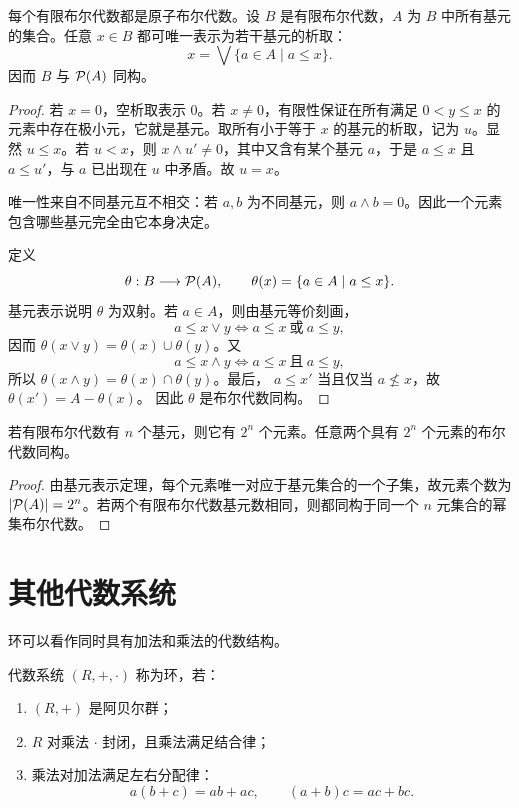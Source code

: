 \begin{theorem}[有限布尔代数的基元表示]\label{finite-boolean-atoms}
  每个有限布尔代数都是原子布尔代数。设 $B$ 是有限布尔代数，$A$ 为 $B$ 中所有基元的集合。任意 $x\in B$ 都可唯一表示为若干基元的析取：
  \[
  x=\bigvee\{a\in A\mid a\le x\}.
  \]
  因而 $B$ 与 $\mathcal P(A)$ 同构。
\end{theorem}

\begin{proof}
  若 $x=0$，空析取表示 $0$。若 $x\ne0$，有限性保证在所有满足 $0<y\le x$ 的元素中存在极小元，它就是基元。取所有小于等于 $x$ 的基元的析取，记为 $u$。显然 $u\le x$。若 $u<x$，则 $x\wedge u'\ne0$，其中又含有某个基元 $a$，于是 $a\le x$ 且 $a\le u'$，与 $a$ 已出现在 $u$ 中矛盾。故 $u=x$。

  唯一性来自不同基元互不相交：若 $a,b$ 为不同基元，则 $a\wedge b=0$。因此一个元素包含哪些基元完全由它本身决定。

  定义
  \[
  \theta:B\longrightarrow\mathcal P(A),\qquad
  \theta(x)=\{a\in A\mid a\le x\}.
  \]
  基元表示说明 $\theta$ 为双射。若 $a\in A$，则由基元等价刻画，
  \[
  a\le x\vee y\Longleftrightarrow a\le x\ \text{或}\ a\le y,
  \]
  因而 $\theta(x\vee y)=\theta(x)\cup\theta(y)$。又
  \[
  a\le x\wedge y\Longleftrightarrow a\le x\ \text{且}\ a\le y,
  \]
  所以 $\theta(x\wedge y)=\theta(x)\cap\theta(y)$。最后，
  $a\le x'$ 当且仅当 $a\nleq x$，故 $\theta(x')=A-\theta(x)$。
  因此 $\theta$ 是布尔代数同构。
\end{proof}

\begin{theorem}[有限布尔代数的大小]\label{finite-boolean-size}
  若有限布尔代数有 $n$ 个基元，则它有 $2^n$ 个元素。任意两个具有 $2^n$ 个元素的布尔代数同构。
\end{theorem}

\begin{proof}
  由基元表示定理，每个元素唯一对应于基元集合的一个子集，故元素个数为 $\lvert\mathcal P(A)\rvert=2^n$。若两个有限布尔代数基元数相同，则都同构于同一个 $n$ 元集合的幂集布尔代数。
\end{proof}

\section{其他代数系统}

环可以看作同时具有加法和乘法的代数结构。

\begin{definition}[环]\label{ring}
  代数系统 $(R,+,\cdot)$ 称为环，若：
  \begin{enumerate}
    \item $(R,+)$ 是阿贝尔群；
    \item $R$ 对乘法 $\cdot$ 封闭，且乘法满足结合律；
    \item 乘法对加法满足左右分配律：
    \[
    a(b+c)=ab+ac,\qquad (a+b)c=ac+bc.
    \]
  \end{enumerate}
\end{definition}

